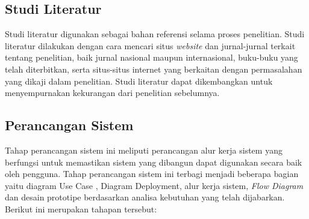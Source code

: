 \subsection{Studi Literatur}
Studi literatur digunakan sebagai bahan referensi selama proses penelitian. Studi literatur dilakukan dengan cara mencari situs \textit{website} dan jurnal-jurnal terkait tentang penelitian, baik jurnal nasional maupun internasional, buku-buku yang telah diterbitkan, serta situs-situs internet yang berkaitan dengan permasalahan yang dikaji dalam penelitian. Studi literatur dapat dikembangkan untuk menyempurnakan kekurangan dari penelitian sebelumnya.

\subsection{Perancangan Sistem}
Tahap perancangan sistem ini meliputi perancangan alur kerja sistem yang berfungsi untuk memastikan sistem yang dibangun dapat digunakan secara baik oleh pengguna. Tahap perancangan sistem ini terbagi menjadi beberapa bagian yaitu diagram Use Case , Diagram Deployment, alur kerja sistem, \textit{Flow Diagram} dan desain prototipe berdasarkan analisa kebutuhan yang telah dijabarkan. Berikut ini merupakan tahapan tersebut:



